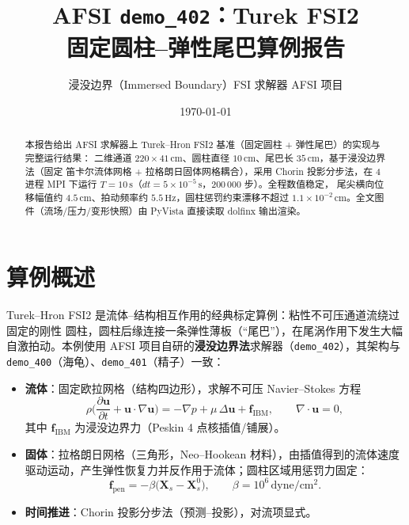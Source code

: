 \documentclass[11pt]{ctexart}
\title{\bfseries AFSI \texttt{demo\_402}：Turek FSI2\\固定圆柱--弹性尾巴算例报告}
\author{浸没边界（Immersed Boundary）FSI 求解器 \quad AFSI 项目}
\date{\today}
\newcommand{\cm}{\,\mathrm{cm}}
\newcommand{\dyn}{\,\mathrm{dyne}}
\begin{document}
\maketitle

\begin{abstract}
本报告给出 AFSI 求解器上 Turek--Hron FSI2 基准（固定圆柱 + 弹性尾巴）的实现与完整运行结果：
二维通道 $220\times41\cm$、圆柱直径 $10\cm$、尾巴长 $35\cm$，基于浸没边界法（固定
笛卡尔流体网格 + 拉格朗日固体网格耦合），采用 Chorin 投影分步法，在 4 进程 MPI 下运行
$T=10\,\mathrm{s}$（$dt=5\times10^{-5}\,\mathrm{s}$，200\,000 步）。全程数值稳定，
尾尖横向位移幅值约 $4.5\cm$、拍动频率约 $5.5\,\mathrm{Hz}$，圆柱惩罚约束漂移不超过
$1.1\times10^{-2}\cm$。全文图件（流场/压力/变形快照）由 PyVista 直接读取
dolfinx 输出渲染。
\end{abstract}

\section{算例概述}

Turek--Hron FSI2 是流体--结构相互作用的经典标定算例：粘性不可压通道流绕过固定的刚性
圆柱，圆柱后缘连接一条弹性薄板（``尾巴''），在尾涡作用下发生大幅自激拍动。本例使用
AFSI 项目自研的\textbf{浸没边界法}求解器（\texttt{demo\_402}），其架构与
\texttt{demo\_400}（海龟）、\texttt{demo\_401}（精子）一致：

\begin{itemize}
  \item \textbf{流体}：固定欧拉网格（结构四边形），求解不可压 Navier--Stokes 方程
        \begin{equation}
          \rho\Big(\frac{\partial \boldsymbol u}{\partial t}
          + \boldsymbol u\cdot\nabla\boldsymbol u\Big)
          = -\nabla p + \mu\,\Delta \boldsymbol u + \boldsymbol f_{\mathrm{IBM}},
          \qquad \nabla\cdot\boldsymbol u = 0,
        \end{equation}
        其中 $\boldsymbol f_{\mathrm{IBM}}$ 为浸没边界力（Peskin 4 点核插值/铺展）。
  \item \textbf{固体}：拉格朗日网格（三角形，Neo--Hookean 材料），由插值得到的流体速度
        驱动运动，产生弹性恢复力并反作用于流体；圆柱区域用惩罚力固定：
        \begin{equation}
          \boldsymbol f_{\mathrm{pen}} = -\beta\big(\boldsymbol X_s - \boldsymbol X_s^{0}\big),
          \qquad \beta = 10^{6}\dyn/\mathrm{cm}^{2}.
        \end{equation}
  \item \textbf{时间推进}：Chorin 投影分步法（预测--投影），对流项显式。
\end{itemize}
\end{document}
